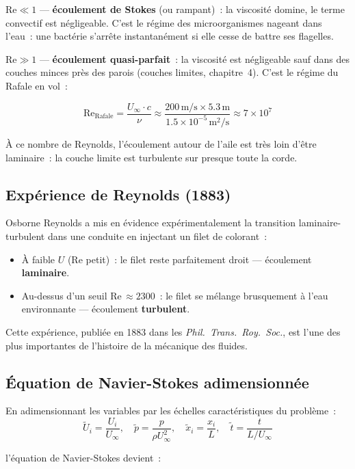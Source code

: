 \documentclass[11pt,a4paper]{report}
\begin{document}
\medskip
$\mathrm{Re} \ll 1$ --- \textbf{écoulement de Stokes} (ou rampant)~: la viscosité
domine, le terme convectif est négligeable. C'est le régime des microorganismes
nageant dans l'eau~: une bactérie s'arrête instantanément si elle cesse de
battre ses flagelles.

\medskip
$\mathrm{Re} \gg 1$ --- \textbf{écoulement quasi-parfait}~: la viscosité est
négligeable sauf dans des couches minces près des parois (couches limites,
chapitre~4). C'est le régime du Rafale en vol~:

\[
    \mathrm{Re}_\text{Rafale} = \frac{U_\infty \cdot c}{\nu}
    \approx \frac{200\,\text{m/s} \times 5.3\,\text{m}}{1.5\times10^{-5}\,\text{m}^2/\text{s}}
    \approx 7\times10^7
\]

À ce nombre de Reynolds, l'écoulement autour de l'aile est très loin d'être
laminaire~: la couche limite est turbulente sur presque toute la corde.

\subsection{Expérience de Reynolds (1883)}

Osborne Reynolds a mis en évidence expérimentalement la transition
laminaire-turbulent dans une conduite en injectant un filet de colorant~:
\begin{itemize}
    \item À faible $U$ (Re petit)~: le filet reste parfaitement droit --- écoulement \textbf{laminaire}.
    \item Au-dessus d'un seuil Re\,$\approx 2300$~: le filet se mélange brusquement
    à l'eau environnante --- écoulement \textbf{turbulent}.
\end{itemize}
Cette expérience, publiée en 1883 dans les \textit{Phil.\ Trans.\ Roy.\ Soc.},
est l'une des plus importantes de l'histoire de la mécanique des fluides.

\subsection{Équation de Navier-Stokes adimensionnée}

En adimensionnant les variables par les échelles caractéristiques du problème~:
\[
    \tilde{U}_i = \frac{U_i}{U_\infty}, \quad
    \tilde{p} = \frac{p}{\rho U_\infty^2}, \quad
    \tilde{x}_i = \frac{x_i}{L}, \quad
    \tilde{t} = \frac{t}{L/U_\infty}
\]

l'équation de Navier-Stokes devient~:
\end{document}
